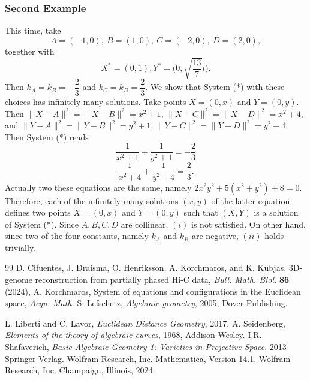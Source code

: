 \documentclass[10pt]{amsart}
\theoremstyle{definition}
\theoremstyle{remark}
\begin{document}
\subsubsection{Second Example}
\label{seex2}
This time, take 
$$A=(-1,0),\ B=(1,0),\ C=(-2,0),\ D=(2,0),$$
together with 
$$X^*=(0,1),Y^*=\Big(0,\sqrt{\frac{13}{7}}i\Big).$$
Then $k_A=k_B=-\dfrac{2}{3}$ and $k_C=k_D=\dfrac{2}{3}$. We show that System (*) with these choices has infinitely many solutions. Take points $X=(0,x)$ and $Y=(0,y)$. 
Then $\|X-A\|^2=\|X-B\|^2=x^2+1$, $\|X-C\|^2=\|X-D\|^2=x^2+4$, and $\|Y-A\|^2=\|Y-B\|^2=y^2+1$, $\|Y-C\|^2=\|Y-D\|^2=y^2+4$. Then System (*) reads 
$$ \frac{1}{x^2+1} +\frac{1}{y^2+1}=-\frac{2}{3}$$
$$\frac{1}{x^2+4} +\frac{1}{y^2+4}=\frac{2}{3}.$$
Actually two these equations are the same, namely $2x^2y^2+5(x^2+y^2)+8=0$. Therefore, each of the infinitely many solutions $(x,y)$ of the latter equation defines two points $X=(0,x)$ and $Y=(0,y)$ such that $(X,Y)$ is a solution of System (*). Since $A,B,C,D$ are collinear, $(i)$ is not satisfied. On other hand,
since two of the four constants, namely $k_A$ and $k_B$ are negative, $(ii)$ holds trivially. 
\begin{thebibliography}{99}
 D. Cifuentes, J. Draisma, O. Henriksson, A. Korchmaros, and K. Kubjas, 3D-genome reconstruction from partially phased Hi-C data, \emph{Bull. Math. Biol.} {\bf{86}} (2024),
 A. Korchmaros, System of equations and configurations in the Euclidean space, \emph{Aequ. Math.}
S. Lefschetz, \emph{Algebraic geometry}, 2005, Dover Publishing. 

 L. Liberti and C, Lavor, \emph{Euclidean Distance Geometry},
2017.
 A. Seidenberg, \emph{Elements of the theory of algebraic curves}, 1968,
Addison-Wesley. 
 I.R. Shafaverich, \emph{Basic Algebraic Geometry 1: Varieties in Projective Space}, 2013 Springer Verlag. 
 Wolfram Research, Inc. Mathematica, Version 14.1, Wolfram Research, Inc.
Champaign, Illinois, 2024.  

\end{thebibliography}
\end{document}
